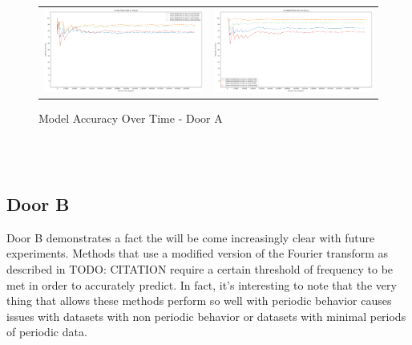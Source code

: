 \begin{figure}
  \begin{tabular}{cc}
    {\includegraphics[width = 3in]{images/results/Future_Predictions_on_door_A.png}} &
    {\includegraphics[width = 3in]{images/results/Historical_Predictions_on_door_A.png}} \\
  \end{tabular}
  \caption{Model Accuracy Over Time - Door A}
\end{figure} \\ \\

\subsection { Door B }

Door B demonstrates a fact the will be come increasingly clear with future
experiments.  Methods that use a modified version of the Fourier transform as
described in TODO: CITATION require a certain threshold of frequency to be met
in order to accurately predict.  In fact, it's interesting to note that the
very thing that allows these methods perform so well with periodic behavior
causes issues with datasets with non periodic behavior or datasets with
minimal periods of periodic data. \\

\begin{table}[h!]
  \centering
  \caption{Door B Data Overview}
\end{table} \\

